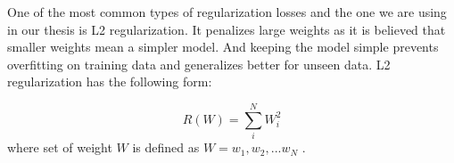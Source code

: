 One of the most common types of regularization losses and the one we are using in our thesis is L2 regularization. It penalizes large weights as it is believed that smaller weights mean a simpler model. And keeping the model simple prevents overfitting on training data and generalizes better for unseen data. L2 regularization has the following form: 

\begin{equation}
    R(W) = \sum_{i}^N W_i ^ 2 
\end{equation}
where set of weight $W$ is defined as $W = w_1, w_2, ... w_N$ \cite{standford}.








